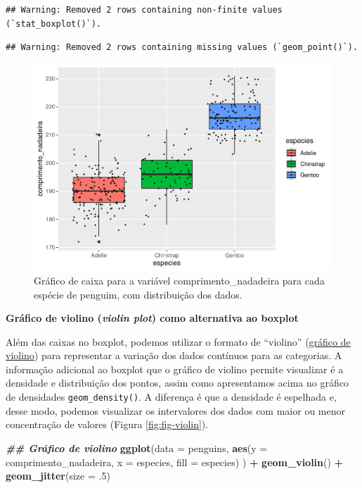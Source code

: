 \documentclass[
]{article}
\newenvironment{Shaded}{\begin{snugshade}}{\end{snugshade}}
\newcommand{\AttributeTok}[1]{\textcolor[rgb]{0.13,0.29,0.53}{#1}}
\newcommand{\DecValTok}[1]{\textcolor[rgb]{0.00,0.00,0.81}{#1}}
\newcommand{\DocumentationTok}[1]{\textcolor[rgb]{0.56,0.35,0.01}{\textbf{\textit{#1}}}}
\newcommand{\FunctionTok}[1]{\textcolor[rgb]{0.13,0.29,0.53}{\textbf{#1}}}
\newcommand{\NormalTok}[1]{#1}
\newcommand{\SpecialCharTok}[1]{\textcolor[rgb]{0.81,0.36,0.00}{\textbf{#1}}}
\begin{document}
\begin{verbatim}
## Warning: Removed 2 rows containing non-finite values (`stat_boxplot()`).
\end{verbatim}

\begin{verbatim}
## Warning: Removed 2 rows containing missing values (`geom_point()`).
\end{verbatim}

\begin{figure}
\centering
\includegraphics{epr_files/figure-latex/fig-boxplot-jitter-1.pdf}
\caption{\label{fig:fig-boxplot-jitter}Gráfico de caixa para a variável comprimento\_nadadeira para cada espécie de penguim, com distribuição dos dados.}
\end{figure}

\textbf{Gráfico de violino (\emph{violin plot}) como alternativa ao boxplot}

Além das caixas no boxplot, podemos utilizar o formato de ``violino'' (\href{https://datavizproject.com/data-type/violin-plot/}{gráfico de violino}) para representar a variação dos dados contínuos para as categorias. A informação adicional ao boxplot que o gráfico de violino permite visualizar é a densidade e distribuição dos pontos, assim como apresentamos acima no gráfico de densidades \texttt{geom\_density()}. A diferença é que a densidade é espelhada e, desse modo, podemos visualizar os intervalores dos dados com maior ou menor concentração de valores (Figura \ref{fig:fig-violin}).

\begin{Shaded}
\begin{Highlighting}[]
\DocumentationTok{\#\# Gráfico de violino}
\FunctionTok{ggplot}\NormalTok{(}\AttributeTok{data =}\NormalTok{ penguins, }
       \FunctionTok{aes}\NormalTok{(}\AttributeTok{y =}\NormalTok{ comprimento\_nadadeira, }\AttributeTok{x =}\NormalTok{ especies, }\AttributeTok{fill =}\NormalTok{ especies)}
\NormalTok{       ) }\SpecialCharTok{+}
    \FunctionTok{geom\_violin}\NormalTok{() }\SpecialCharTok{+}
    \FunctionTok{geom\_jitter}\NormalTok{(}\AttributeTok{size =}\NormalTok{ .}\DecValTok{5}\NormalTok{)}
\end{Highlighting}
\end{Shaded}
\end{document}
